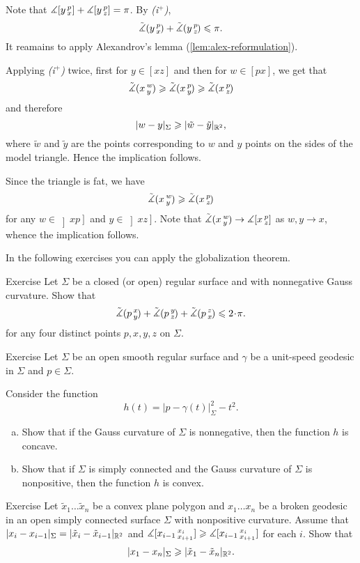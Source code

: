 Note that $\measuredangle[y\,{}^{p}_{x}]+\measuredangle[y\,{}^{p}_{z}]=\pi$.
By \textit{(i$^{+}$)}, 
\[\tilde\measuredangle(y\,{}^{p}_{x}\hspace{-0.2ex})+\tilde\measuredangle(y\,{}^{p}_{z}\hspace{-0.2ex})\leqslant \pi.\]
It reamains to apply Alexandrov's lemma (\ref{lem:alex-reformulation}).


Applying \textit{(i$^{+}$)} twice, first for $y\in [xz]$ and then for $w\in [px]$, we get that
\[\tilde\measuredangle(x\,{}^{w}_{y}\hspace{-0.2ex}) \geqslant \tilde\measuredangle(x\,{}^{p}_{y}\hspace{-0.2ex}) \geqslant \tilde\measuredangle(x\,{}^{p}_{z}\hspace{-0.2ex})\]
and therefore
\[|w-y|_\Sigma\geqslant |\tilde w-\tilde y|_{\mathbb{R}^2},\]
where $\tilde w$ and $\tilde y$ are the points corresponding to $w$ and $y$ points on the sides of the model triangle. Hence the implication follows.

Since the triangle is fat, we have 
\[\tilde\measuredangle(x\,{}^{w}_{y}\hspace{-0.2ex}) \geqslant \tilde\measuredangle(x\,{}^{p}_{z}\hspace{-0.2ex})\]
for any $w\in \left]xp\right]$ and $y\in \left]xz\right]$.
Note that $\tilde\measuredangle(x\,{}^{w}_{y}\hspace{-0.2ex})\to \measuredangle[x\,{}^{p}_{z}]$ as $w,y\to x$, whence the implication follows.
\qeds

In the following exercises you can apply the globalization theorem.

\begin{thm}{Exercise}\label{ex:sum=<2pi}
Let $\Sigma$ be a closed (or open) regular surface and with nonnegative Gauss curvature.
Show that 
\[\angk pxy+\angk pyz+\angk pzx\le2\cdot \pi.\]
for any four distinct points $p,x,y,z$ on $\Sigma$.
\end{thm}

\begin{thm}{Exercise}\label{ex:geod-convexity}
Let $\Sigma$ be an open smooth regular surface
and $\gamma$ be a unit-speed geodesic in $\Sigma$ and $p\in\Sigma$.

Consider the function
\[h(t)=|p-\gamma(t)|_\Sigma^2-t^2.\]

\begin{enumerate}[(a)]
\item Show that if the Gauss curvature of $\Sigma$ is nonnegative, then the function $h$ is concave.
\item Show that if $\Sigma$ is simply connected and the Gauss curvature of $\Sigma$ is nonpositive, then the function $h$ is convex.
\end{enumerate}
\end{thm}

\begin{thm}{Exercise}\label{ex:arm-lemma}
Let $\tilde x_1\dots\tilde x_n$ be a convex plane polygon and
$x_1\dots x_n$ be a broken geodesic in an open simply connected surface $\Sigma$ with nonpositive curvature.
Assume that
$|x_i-x_{i-1}|_\Sigma=|\tilde x_i-\tilde x_{i-1}|_{\mathbb{R}^2}$ and
$\measuredangle[x_{i-1}\,{}^{x_i}_{x_{i+1}}]\geqslant \measuredangle[x_{i-1}\,{}^{x_i}_{x_{i+1}}]$
 for each $i$.
Show that \[|x_1-x_n|_\Sigma\ge |\tilde x_1\z-\tilde x_n|_{\RR^2}.\]
\end{thm}


